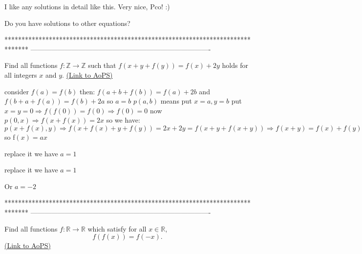 \begin{solution}
	I like any solutions in detail like this. Very nice, Pco! :)
\end{solution}



\begin{solution}
	Do you have solutions to other equations?
\end{solution}
*******************************************************************************
-------------------------------------------------------------------------------

\begin{problem}
	Find all functions $f:\mathbb{Z} \rightarrow \mathbb{Z}$ such that $f(x+y+f(y))=f(x)+2y$ holds for all integers $x$ and $y$.
	\flushright \href{https://artofproblemsolving.com/community/c6h442320}{(Link to AoPS)}
\end{problem}



\begin{solution}
	consider $f(a)=f(b)$ then:
$f(a+b+f(b))=f(a)+2b$ and $f(b+a+f(a))=f(b)+2a$  so $a=b$ 
$p(a,b)$ means put $x=a , y=b$
put $x=y=0 \Rightarrow f(f(0))=f(0) \Rightarrow f(0)=0$ now  $p(0,x) \Rightarrow f(x+f(x))=2x$
so we have:
$p(x+f(x),y) \Rightarrow f(x+f(x)+y+f(y))=2x+2y=f(x+y+f(x+y)) \Rightarrow f(x+y)=f(x)+f(y)  $ so f$(x)=ax$

replace it we have $a=1$
\end{solution}



\begin{solution}
	\begin{tcolorbox} replace it we have $a=1$\end{tcolorbox}
Or $a=-2$
\end{solution}
*******************************************************************************
-------------------------------------------------------------------------------

\begin{problem}
	Find all functions $f: \mathbb R \to \mathbb R$ which satisfy for all $x \in \mathbb R$,
\[f(f(x))=f(-x).\]
	\flushright \href{https://artofproblemsolving.com/community/c6h442519}{(Link to AoPS)}
\end{problem}



